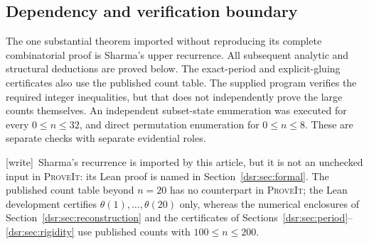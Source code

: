 \documentclass[11pt,a4paper]{article}
\numberwithin{equation}{section}
\theoremstyle{definition}
\theoremstyle{remark}
\newcommand{\repo}{\textsc{ProveIt}}
\newcommand{\wtag}{\textup{[write]}}
\theoremstyle{definition}
\theoremstyle{plain}
\begin{document}
\subsection{Dependency and verification boundary}
The one substantial theorem imported without reproducing its complete
combinatorial proof is Sharma's upper recurrence. All subsequent analytic and
structural deductions are proved below. The exact-period and explicit-gluing
certificates also use the published count table. The supplied program verifies
the required integer inequalities, but that does not independently prove the
large counts themselves. An independent subset-state enumeration was executed
for every $0\le n\le32$, and direct permutation enumeration for $0\le n\le8$.
These are separate checks with separate evidential roles.

\wtag\ Sharma's recurrence is imported by this article, but it is not an
unchecked input in \repo: its Lean proof is named in
Section~\ref{dsr:sec:formal}. The published count table beyond $n=20$ has no
counterpart in \repo; the Lean development certifies $\theta(1),\ldots,
\theta(20)$ only, whereas the numerical enclosures of
Section~\ref{dsr:sec:reconstruction} and the certificates of
Sections~\ref{dsr:sec:period}--\ref{dsr:sec:rigidity} use published counts
with $100\le n\le200$.
\end{document}
